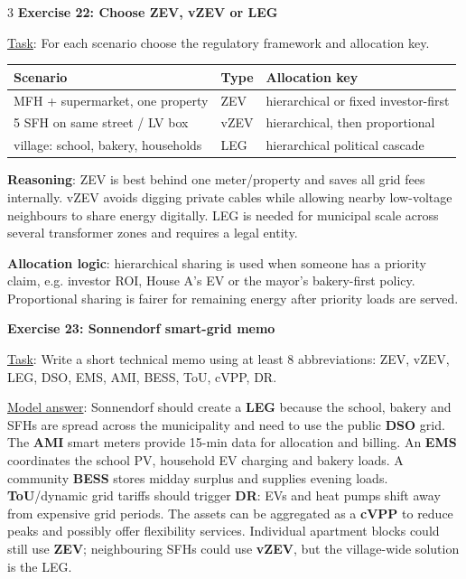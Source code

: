 \documentclass[9pt, landscape, a4paper]{article}
\begin{document}
\begin{multicols*}{3}
\textbf{Exercise 22: Choose ZEV, vZEV or LEG}

\underline{Task}: For each scenario choose the regulatory framework and
allocation key.

\begin{tabularx}{\columnwidth}{@{}XlX@{}}
  \toprule
  \textbf{Scenario} & \textbf{Type} & \textbf{Allocation key}\\
  \midrule
  MFH + supermarket, one property & ZEV & hierarchical or fixed investor-first\\
  5 SFH on same street / LV box & vZEV & hierarchical, then proportional\\
  village: school, bakery, households & LEG & hierarchical political cascade\\
  \bottomrule
\end{tabularx}

\textbf{Reasoning}: ZEV is best behind one meter/property and saves all grid
fees internally. vZEV avoids digging private cables while allowing nearby
low-voltage neighbours to share energy digitally. LEG is needed for municipal
scale across several transformer zones and requires a legal entity.

\textbf{Allocation logic}: hierarchical sharing is used when someone has a
priority claim, e.g. investor ROI, House A's EV or the mayor's bakery-first
policy. Proportional sharing is fairer for remaining energy after priority
loads are served.

\textbf{Exercise 23: Sonnendorf smart-grid memo}

\underline{Task}: Write a short technical memo using at least 8 abbreviations:
ZEV, vZEV, LEG, DSO, EMS, AMI, BESS, ToU, cVPP, DR.

\underline{Model answer}:
Sonnendorf should create a \textbf{LEG} because the school, bakery and SFHs are
spread across the municipality and need to use the public \textbf{DSO} grid.
The \textbf{AMI} smart meters provide 15-min data for allocation and billing.
An \textbf{EMS} coordinates the school PV, household EV charging and bakery
loads. A community \textbf{BESS} stores midday surplus and supplies evening
loads. \textbf{ToU}/dynamic grid tariffs should trigger \textbf{DR}: EVs and
heat pumps shift away from expensive grid periods. The assets can be aggregated
as a \textbf{cVPP} to reduce peaks and possibly offer flexibility services.
Individual apartment blocks could still use \textbf{ZEV}; neighbouring SFHs
could use \textbf{vZEV}, but the village-wide solution is the LEG.


\end{multicols*}
\end{document}
